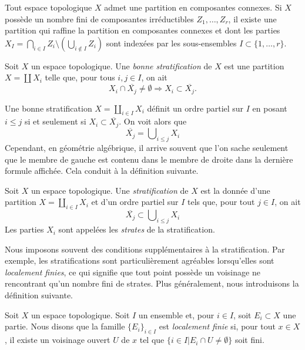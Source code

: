 \noindent
Tout espace topologique $X$ admet une partition en composantes connexes.
Si $X$ possède un nombre fini de composantes irréductibles
$Z_1, \ldots, Z_r$, il existe une partition qui raffine la partition en
composantes connexes et dont les parties
$X_I = \bigcap_{i \in I} Z_i \setminus (\bigcup_{i \not \in I} Z_i)$
sont indexées par les sous-ensembles $I \subset \{1, \ldots, r\}$.

\begin{definition}
\label{definition-good-stratification}
Soit $X$ un espace topologique. Une {\it bonne stratification}
de $X$ est une partition $X = \coprod X_i$ telle que, pour tous
$i, j \in I$, on ait
$$
X_i \cap \overline{X_j} \not = \emptyset
\Rightarrow
X_i \subset \overline{X_j}.
$$
\end{definition}

\noindent
Une bonne stratification $X = \coprod_{i \in I} X_i$ définit
un ordre partiel sur $I$ en posant $i \leq j$ si et seulement si
$X_i \subset \overline{X_j}$. On voit alors que
$$
\overline{X_j} = \bigcup\nolimits_{i \leq j} X_i
$$
Cependant, en géométrie algébrique, il arrive souvent que l'on sache seulement
que le membre de gauche est contenu dans le membre de droite dans la dernière
formule affichée. Cela conduit à la définition suivante.

\begin{definition}
\label{definition-stratification}
Soit $X$ un espace topologique. Une {\it stratification} de $X$ est
la donnée d'une partition $X = \coprod_{i \in I} X_i$ et d'un ordre partiel
sur $I$ tels que, pour tout $j \in I$, on ait
$$
\overline{X_j} \subset \bigcup\nolimits_{i \leq j} X_i
$$
Les parties $X_i$ sont appelées les {\it strates} de la stratification.
\end{definition}

\noindent
Nous imposons souvent des conditions supplémentaires à la stratification.
Par exemple, les stratifications sont particulièrement agréables lorsqu'elles
sont {\it localement finies}, ce qui signifie que tout point possède un
voisinage ne rencontrant qu'un nombre fini de strates. Plus généralement,
nous introduisons la définition suivante.

\begin{definition}
\label{definition-locally-finite}
Soit $X$ un espace topologique. Soit $I$ un ensemble et, pour $i \in I$,
soit $E_i \subset X$ une partie. Nous disons que la famille
$\{E_i\}_{i \in I}$ est {\it localement finie} si, pour tout $x \in X$,
il existe un voisinage ouvert $U$ de $x$ tel que
$\{i \in I | E_i \cap U \not = \emptyset\}$ soit fini.
\end{definition}


